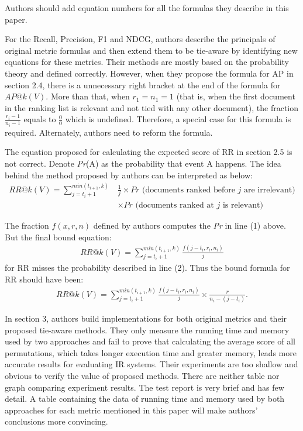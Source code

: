 \documentclass{article}
\begin{document}
Authors should add equation numbers for all the formulas they describe in this paper. 

For the Recall, Precision, F1 and NDCG, authors describe the principals of original metric formulas and then extend them to be tie-aware by identifying new equations for these metrics. Their methods are mostly based on the probability theory and defined correctly. However, when they propose the formula for AP in section 2.4, there is a unnecessary right bracket at the end of the formula for $AP@k(V)$. More than that, when $r_1 = n_1 = 1$ (that is, when the first document in the ranking list is relevant and not tied with any other document), the fraction $\frac{r_i-1}{n_i-1}$ equals to $\frac{0}{0}$ which is undefined. Therefore, a special case for this formula is required. Alternately, authors need to reform the formula.


The equation proposed for calculating the expected score of RR in section 2.5 is not correct. Denote \textit{Pr}(A) as the probability that event A happens. The idea behind the method proposed by authors can be interpreted as below:
\begin{align}
RR@k(V) = \sum_{j=t_i+1}^{min(t_{i+1}, k)} & \frac{1}{j} \times \textit{Pr}\text{ (documents ranked before $j$ are irrelevant)} \\
& \times \textit{Pr}\text{ (documents ranked at $j$ is relevant)}
\end{align}

The fraction $f(x, r, n)$ defined by authors computes the \textit{Pr} in line (1) above. But the final bound equation:
\begin{align}
RR@k(V) = \sum_{j=t_i+1}^{min(t_{i+1}, k)} \frac{f(j-t_i,r_i,n_i)}{j}
\end{align}
 for RR misses the probability described in line (2). Thus the bound formula for RR should have been:
\begin{align}
RR@k(V) = \sum_{j=t_i+1}^{min(t_{i+1}, k)} \frac{f(j-t_i,r_i,n_i)}{j} \times \frac{r}{n_i-(j-t_i)}.
\end{align}


In section 3, authors build implementations for both original metrics and their proposed tie-aware methods. They only measure the running time and memory used by two approaches and fail to prove that calculating the average score of all permutations, which takes longer execution time and greater memory, leads more accurate results for evaluating IR systems. Their experiments are too shallow and obvious to verify the value of proposed methods. There are neither table nor graph comparing experiment results. The test report is very brief and has few detail. A table containing the data of running time and memory used by both approaches for each metric mentioned in this paper will make authors' conclusions more convincing.
\end{document}
